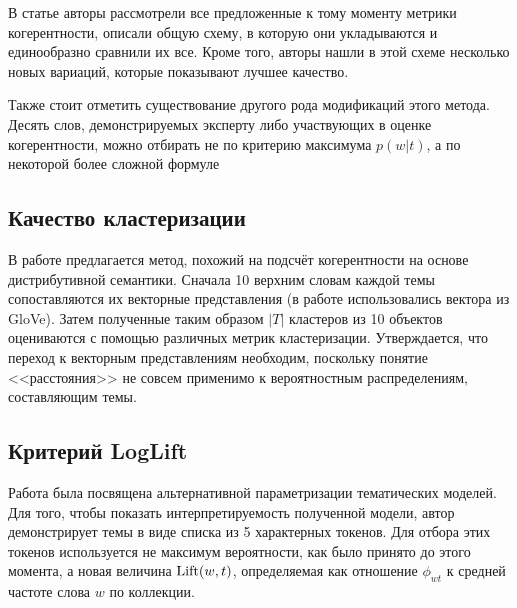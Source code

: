 В статье \cite{roder2015exploring} авторы рассмотрели все предложенные к тому моменту метрики когерентности, описали общую схему, в которую они укладываются и единообразно сравнили их все. Кроме того, авторы нашли в этой схеме несколько новых вариаций, которые показывают лучшее качество. 

Также стоит отметить существование другого рода модификаций этого метода. Десять слов, демонстрируемых эксперту либо участвующих в оценке когерентности, можно отбирать не по критерию максимума $p(w|t)$, а по некоторой более сложной формуле \cite{blei2009topic} \cite{ldavis2014}





\subsection{Качество кластеризации}

В работе \cite{krasnov19clustering} предлагается метод, похожий на подсчёт когерентности на основе дистрибутивной семантики. Сначала 10 верхним словам каждой темы сопоставляются их векторные представления (в работе использовались вектора из GloVe). Затем полученные таким образом $|T|$ кластеров из 10 объектов оцениваются с помощью различных метрик кластеризации. Утверждается, что переход к векторным представлениям необходим, поскольку понятие <<расстояния>> не совсем применимо к вероятностным распределениям, составляющим темы.


\subsection{Критерий LogLift}
Работа \cite{taddy2012estimation} была посвящена альтернативной параметризации тематических моделей. Для того, чтобы показать интерпретируемость полученной модели, автор демонстрирует темы в виде списка из 5 характерных токенов. Для отбора этих токенов используется не максимум вероятности, как было принято до этого момента, а новая величина $\textup{Lift}(w, t)$, определяемая как отношение $\phi_{wt}$ к средней частоте слова $w$ по коллекции.


